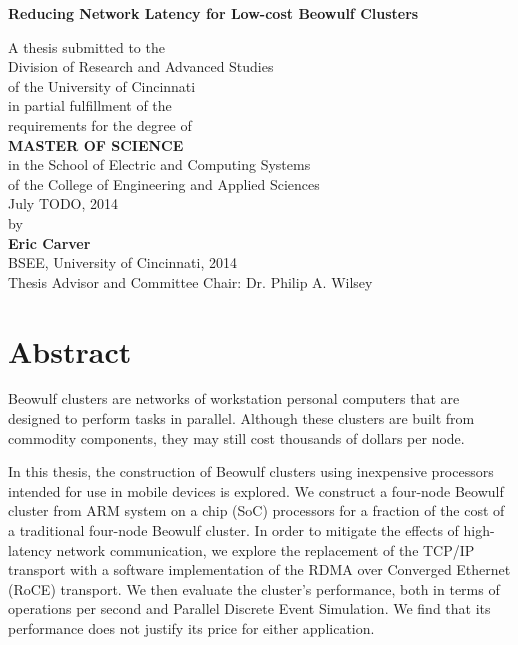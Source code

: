 \documentclass[11pt]{book}
\begin{document}
\thispagestyle{empty}

\doublespacing

\vspace*{0.5in}

\begin{center}
  \LARGE{\textbf{Reducing Network Latency for Low-cost Beowulf Clusters}}

  \vspace*{0.4in}

  {\large A thesis submitted to the\\[0.20in]
    Division of Research and Advanced Studies\\
    of the University of Cincinnati\\[0.20in]
    in partial fulfillment of the\\
    requirements for the degree of\\[0.20in]
    {\bf MASTER OF SCIENCE}\\[0.20in]
    in the School of Electric and Computing Systems\\
    of the College of Engineering and Applied
    Sciences\\[0.20in]
    July TODO, 2014\\[0.20in]
    by\\[0.20in]
    {\bf Eric Carver}\\
    BSEE, University of
    Cincinnati, 2014\\}
  \vspace{0.5in}
  {\large Thesis Advisor and Committee Chair:  Dr. Philip A. Wilsey}
\end{center}

\clearpage

\setcounter{page}{1}
\clearpage

\chapter*{Abstract}

Beowulf clusters are networks of workstation personal computers that are
designed to perform tasks in parallel. Although these clusters are built from
commodity components, they may still cost thousands of dollars per node.

In this thesis, the construction of Beowulf clusters using inexpensive
processors intended for use in mobile devices is explored. We construct a
four-node Beowulf cluster from ARM system on a chip (SoC) processors for a
fraction of the cost of a traditional four-node Beowulf cluster. In order to
mitigate the effects of high-latency network communication, we explore the
replacement of the TCP/IP transport with a software implementation of the RDMA
over Converged Ethernet (RoCE) transport. We then evaluate the cluster's
performance, both in terms of operations per second and Parallel Discrete Event
Simulation.  We find that its performance does not justify its price for either
application.
\end{document}
